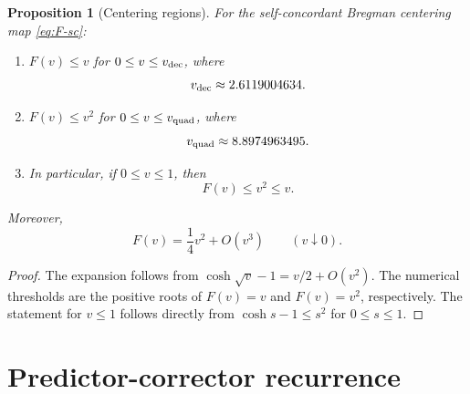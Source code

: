 \documentclass[11pt]{article}
\newtheorem{proposition}[theorem]{Proposition}
\begin{document}
\begin{proposition}[Centering regions]
For the self-concordant Bregman centering map \eqref{eq:F-sc}:
\begin{enumerate}[label=(\roman*)]
\item $F(v)\le v$ for $0\le v\le v_{\rm dec}$, where
\begin{equation}
  v_{\rm dec}\approx 2.6119004634.
\end{equation}
\item $F(v)\le v^2$ for $0\le v\le v_{\rm quad}$, where
\begin{equation}
  v_{\rm quad}\approx 8.8974963495.
\end{equation}
\item In particular, if $0\le v\le 1$, then
\begin{equation}
  F(v)\le v^2\le v.
\end{equation}
\end{enumerate}
Moreover,
\begin{equation}
  F(v)=\frac14v^2+O(v^3)\qquad(v\downarrow0).
\end{equation}
\end{proposition}

\begin{proof}
The expansion follows from $\cosh\sqrt v-1=v/2+O(v^2)$.  The numerical thresholds are the positive roots of $F(v)=v$ and $F(v)=v^2$, respectively.  The statement for $v\le1$ follows directly from $\cosh s-1\le s^2$ for $0\le s\le1$.
\end{proof}

\section{Predictor-corrector recurrence}
\end{document}
